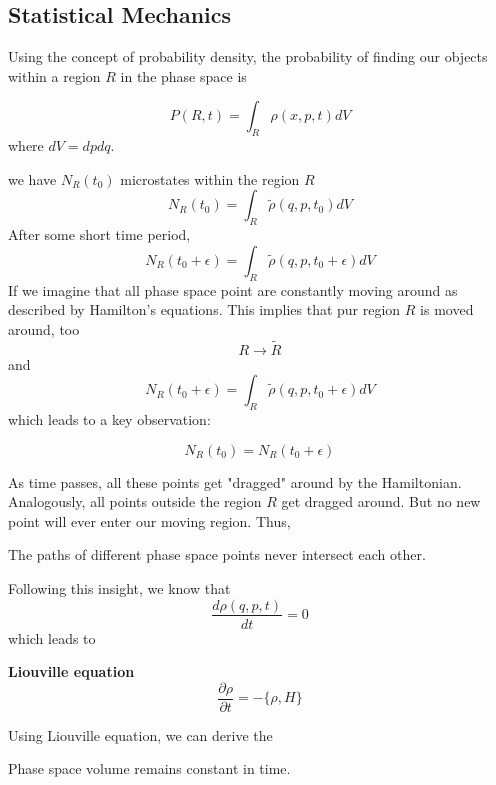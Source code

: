 \subsection{Statistical Mechanics}
Using the concept of probability density, the probability of finding our objects within a region $R$ in the phase space is
\begin{qt}
\begin{equation}
P(R, t)=\int_{R} \rho(x, p, t) d V
\end{equation}
where $dV=dpdq$.
\end{qt}
we have $N_{R}\left(t_{0}\right)$ microstates within the region $R$
\begin{equation}
N_{R}\left(t_{0}\right)=\int_{R} \tilde{\rho}\left(q, p, t_{0}\right) d V
\end{equation}
After some short time period,
\begin{equation}
N_{R}\left(t_{0}+\epsilon\right)=\int_{R} \tilde{\rho}\left(q, p, t_{0}+\epsilon\right) d V
\end{equation}
If we imagine that all phase space point are constantly moving around as described by Hamilton's equations. This implies that pur region $R$ is moved around, too
$$
R \rightarrow \tilde{R}
$$
and 
$$
N_{R}\left(t_{0}+\epsilon\right)=\int_{R} \tilde{\rho}\left(q, p, t_{0}+\epsilon\right) d V
$$
which leads to a key observation:
\begin{qt}
\begin{equation}
N_{R}\left(t_{0}\right)=N_{R}\left(t_{0}+\epsilon\right)
\end{equation}
\end{qt}
As time passes, all these points get "dragged" around by the Hamiltonian. Analogously, all points outside the region $R$ get dragged around. But no new point will ever enter our moving region. Thus,
\begin{qt}
\begin{center}
    The paths of different phase space points never intersect each other.
\end{center}
\end{qt}
Following this insight, we know that
\begin{equation}
\frac{d \rho(q, p, t)}{d t}=0
\end{equation}
which leads to
\begin{qt}
\textbf{Liouville equation}
\begin{equation}
\frac{\partial \rho}{\partial t}=-\{\rho, H\}
\end{equation}
\end{qt}
Using Liouville equation, we can derive the 
\begin{qt}
\begin{center}
    Phase space volume remains constant in time.
\end{center}
\end{qt}
